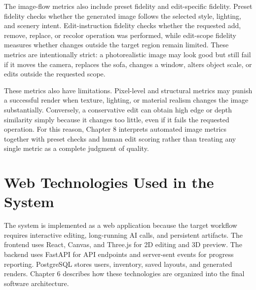 The image-flow metrics also include preset fidelity and edit-specific fidelity. Preset fidelity checks whether the generated image follows the selected style, lighting, and scenery intent. Edit-instruction fidelity checks whether the requested add, remove, replace, or recolor operation was performed, while edit-scope fidelity measures whether changes outside the target region remain limited. These metrics are intentionally strict: a photorealistic image may look good but still fail if it moves the camera, replaces the sofa, changes a window, alters object scale, or edits outside the requested scope.

These metrics also have limitations. Pixel-level and structural metrics may punish a successful render when texture, lighting, or material realism changes the image substantially. Conversely, a conservative edit can obtain high edge or depth similarity simply because it changes too little, even if it fails the requested operation. For this reason, Chapter 8 interprets automated image metrics together with preset checks and human edit scoring rather than treating any single metric as a complete judgment of quality.

\section{Web Technologies Used in the System}\label{sec:web-technologies-used-in-the-system}

The system is implemented as a web application because the target workflow requires interactive editing, long-running AI calls, and persistent artifacts. The frontend uses React, Canvas, and Three.js for 2D editing and 3D preview. The backend uses FastAPI for API endpoints and server-sent events for progress reporting. PostgreSQL stores users, inventory, saved layouts, and generated renders. Chapter 6 describes how these technologies are organized into the final software architecture.
